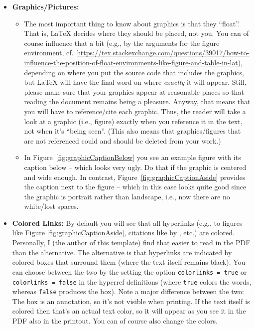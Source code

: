 \begin{itemize}
  
  \item \textbf{Graphics/Pictures:}
  \begin{itemize}
    \item The most important thing to know about graphics is that they ``float''. That is, \LaTeX{} decides where they should be placed, not you. You can of course influence that a bit (e.g., by the arguments for the figure environment, cf.~\url{https://tex.stackexchange.com/questions/39017/how-to-influence-the-position-of-float-environments-like-figure-and-table-in-lat}), depending on where you put the source code that includes the graphics, but \LaTeX{} will have the final word on where \emph{exactly} it will appear. Still, please make sure that your graphics appear at reasonable places so that reading the document remains being a pleasure. Anyway, that means that you will have to reference/cite each graphic. Thus, the reader will take a look at a graphic (i.e., figure) exactly when you reference it in the text, not when it's ``being seen''. (This also means that graphics/figures that are not referenced could and should be deleted from your work.)
    \item In Figure~\ref{fig:graphicCaptionBelow} you see an example figure with its caption below -- which looks very ugly. Do that if the graphic is centered and wide enough. In contrast, Figure~\ref{fig:graphicCaptionAside} provides the caption next to the figure -- which in this case looks quite good since the graphic is portrait rather than landscape, i.e., now there are no white/lost spaces.
  \end{itemize}

  
  \item \textbf{Colored Links:} By default you will see that all hyperlinks (e.g., to figures like Figure \ref{fig:graphicCaptionAside}, citations like by \cite{Smith2021Wubalubadubdub}, etc.) are colored. Personally, I (the author of this template) find that easier to read in the PDF than the alternative. The alternative is that hyperlinks are indicated by colored boxes that surround them (where the text itself remains black). You can choose between the two by the setting the option \verb!colorlinks = true! or \verb!colorlinks = false! in the hyperref definitions (where \verb!true! colors the words, whereas \verb!false! produces the box). Note a major difference between the two: The box is an annotation, so it's not visible when printing. If the text itself is colored then that's an actual text color, so it will appear as you see it in the PDF also in the printout. You can of course also change the colors.


\end{itemize}
